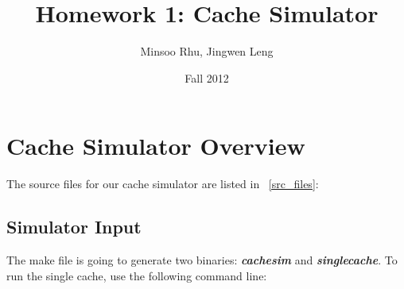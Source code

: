 \documentclass[12pt]{report}
\newcommand{\Tbl}[1]{\tablename~\ref{#1}}
\begin{document}

\title{Homework 1: Cache Simulator}
\author{Minsoo Rhu, Jingwen Leng}
\date{Fall 2012}
\maketitle

\section{Cache Simulator Overview}

The source files for our cache simulator are listed in \Tbl{src_files}:

\begin{table}[h]
\centering  %
\caption{Source files in our cache simulator} %
\label{src_files} %
\end{table}

\subsection{Simulator Input}

The make file is going to generate two binaries: \emph{\textbf{cachesim}} and \emph{\textbf{singlecache}}. To run the single cache, use the following command line:
\end{document}
